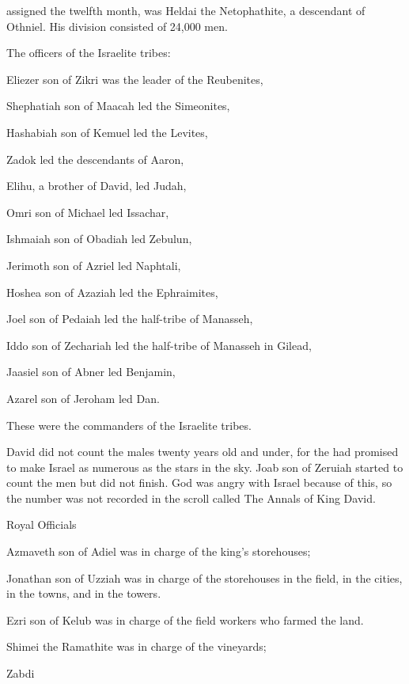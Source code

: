 {assigned the twelfth
month,
was Heldai
the Netophathite,
a descendant of Othniel.
His division
consisted
of 24,000 men.
\par }{\PP {}The officers of the Israelite
tribes:
\par }{\PP Eliezer
son
of Zikri
was the leader
of the Reubenites,
\par }{\PP Shephatiah
son
of Maacah
led the Simeonites,
\par }{\PP {}Hashabiah
son
of Kemuel
led the Levites,
\par }{\PP Zadok
led the descendants of Aaron,
\par }{\PP {}Elihu,
a brother
of David,
led Judah,
\par }{\PP Omri
son
of Michael
led Issachar,
\par }{\PP {}Ishmaiah
son
of Obadiah
led Zebulun,
\par }{\PP Jerimoth
son
of Azriel
led Naphtali,
\par }{\PP {}Hoshea
son
of Azaziah
led the Ephraimites,
\par }{\PP Joel
son
of Pedaiah
led the half-tribe
of Manasseh,
\par }{\PP {}Iddo
son
of Zechariah
led the half-tribe
of Manasseh
in Gilead,
\par }{\PP Jaasiel
son
of Abner
led Benjamin,
\par }{\PP {}Azarel
son
of Jeroham
led Dan.
\par }{\PP These
were the commanders
of the Israelite
tribes.
\par }{\PP {}David
did not
count
the males
twenty
years
old and under,
for
the
{}
had promised
to make
Israel
as numerous
as the stars
in the sky.
Joab
son
of Zeruiah
started
to count
the men but did not
finish.
God was angry
with Israel
because of this,
so
the number
was not
recorded in the scroll called The Annals
of King
David.
\par }{\SH Royal Officials
\par }{\PP {}Azmaveth
son
of Adiel
was in charge of
the king’s
storehouses;
\par }{\PP Jonathan
son
of Uzziah
was in charge of
the storehouses
in the field,
in the cities,
in the towns,
and in the towers.
\par }{\PP {}Ezri
son
of Kelub
was in charge
of the field
workers
who farmed
the land.
\par }{\PP {}Shimei
the Ramathite
was in charge
of the vineyards;
\par }{\PP Zabdi
}
